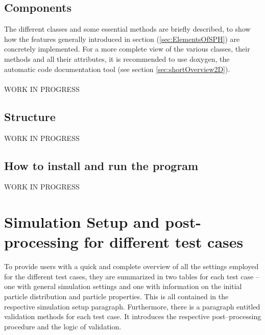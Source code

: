 \documentclass{report}
\begin{document}
\subsection{Components}
\label{sec:Comp2DCode}
The different classes and some essential methods are briefly described, to show how the  features generally introduced in section (\ref{sec:ElementsOfSPH}) are concretely implemented. For a more complete view of the various classes, their methods and all their attributes, it is recommended to use doxygen, the automatic code documentation tool (see section \ref{sec:shortOverview2D}).
\\
\\
WORK IN PROGRESS



\subsection{Structure}
\label{sec:Struc2DCode}

WORK IN PROGRESS

%

\subsection{How to install and run the program}
\label{sec:HowToInstAndRun2D}

WORK IN PROGRESS


\section{Simulation Setup and post-processing for different test cases}
\label{sec:simuSetupTestCases}
To provide users with a quick and complete overview of all the settings employed for the different test cases, they are summarized in two tables for each test case -- one with general simulation settings and one with information on the initial particle distribution and particle properties. This is all contained in the respective simulation setup paragraph. 
Furthermore, there is a paragraph entitled validation methods for each test case. It introduces the respective post--processing procedure and the logic of validation. 
\end{document}
